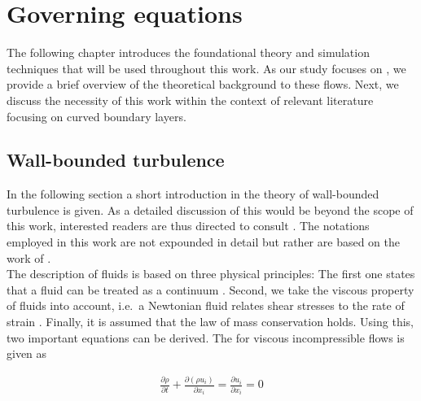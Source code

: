 
\chapter{Governing equations}
\label{chap:basics}
The following chapter introduces the foundational theory and simulation techniques that will be used throughout this work. As our study focuses on , we provide a brief overview of the theoretical background to these flows. Next, we discuss the necessity of this work within the context of relevant literature focusing on curved boundary layers.

\section{Wall-bounded turbulence}\label{sec:turbulenceTheory}


In the following section a short introduction in the theory of wall-bounded turbulence is given.
As a detailed discussion of this would be beyond the scope of this work, interested readers are thus directed to consult \citet{pope_turbulent_2015,moin_fundamentals_2024}.
The notations employed in this work are not expounded in detail but rather are based on the work of \citet{pope_turbulent_2015}. \\
The description of fluids is based on three physical principles:
The first one states that a fluid can be treated as a continuum \citep{batchelor_introduction_2000}.
Second, we take the viscous property of fluids into account, i.e.~a Newtonian fluid relates shear stresses to the rate of strain \citep{tennekes_first_1972}.
Finally, it is assumed that the law of mass conservation holds.
Using this, two important equations can be derived.
The  for viscous incompressible flows is given 
as


\begin{gather}
    \frac{\partial \rho}{\partial t} + \frac{\partial (\rho u_i)}{\partial x_i} = \frac{\partial u_i}{\partial x_i} = 0  
\end{gather}

